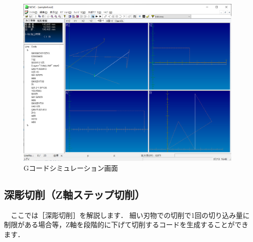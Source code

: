 \begin{figure}[H]
\centering
\includegraphics[scale=0.55]{No3/fig/sample4.png}
\caption{Gコードシミュレーション画面}
\label{fig:sample4.png}
\end{figure}

\subsection{深彫切削（Z軸ステップ切削）}
\label{sec:deep}
　ここでは［深彫切削］を解説します．
細い刃物での切削で1回の切り込み量に制限がある場合等，Z軸を段階的に下げて切削するコードを生成することができます．


